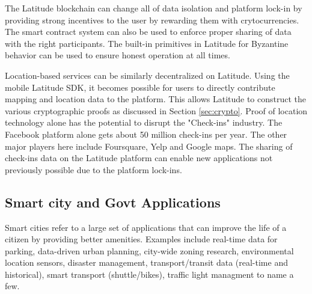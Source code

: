 The Latitude blockchain can change all of data isolation and platform lock-in by providing strong incentives to the user
by rewarding them with crytocurrencies. The smart contract system can also be used to enforce proper sharing of data
with the right participants. The built-in primitives in Latitude for Byzantine behavior can be used to ensure honest
operation at all times.

Location-based services can be similarly decentralized on Latitude. Using the mobile Latitude SDK, it becomes possible
for users to directly contribute mapping and location data to the platform. This allows Latitude to construct the
various cryptographic proofs as discussed in Section \ref{sec:crypto}. Proof of location technology alone has the
potential to disrupt the "Check-ins" industry. The Facebook platform alone gets about 50 million check-ins per year. The
other major players here include Foursquare, Yelp and Google maps. The sharing of check-ins data on the Latitude
platform can enable new applications not previously possible due to the platform lock-ins.

%
%
%
%
\noindent
\subsection{Smart city and Govt Applications}

Smart cities refer to a large set of applications that can improve the life of a citizen by providing better amenities.
Examples include real-time data for parking, data-driven urban planning, city-wide zoning research,
environmental location sensors, disaster management, transport/transit data (real-time and historical), smart transport
(shuttle/bikes), traffic light managment to name a few.

